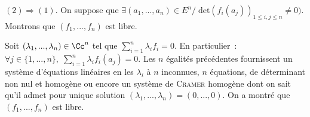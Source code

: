 {\begin{enumerate}
{$(2)\Rightarrow(1)$. On suppose que $\exists(a_1,...,a_n)\in E^n/\;\mbox{det}(f_i(a_j))_{1\leq i,j\leq n}\neq 0)$. Montrons que $(f_1,...,f_n)$ est libre.

Soit $(\lambda_1,...,\lambda_n)\in\Cc^n$ tel que $\sum_{i=1}^{n}\lambda_if_i=0$. En particulier~:~$\forall j\in\{1,...,n\},\;\sum_{i=1}^{n}\lambda_if_i(a_j)=0$. Les $n$ égalités précédentes fournissent un système d'équations linéaires en les $\lambda_i$ à $n$ inconnues, $n$ équations, de déterminant non nul et homogène ou encore un système de \textsc{Cramer} homogène dont on sait qu'il admet pour unique solution $(\lambda_1,...,\lambda_n)=(0,...,0)$. On a montré que $(f_1,...,f_n)$ est libre.
}
\end{enumerate}
}
